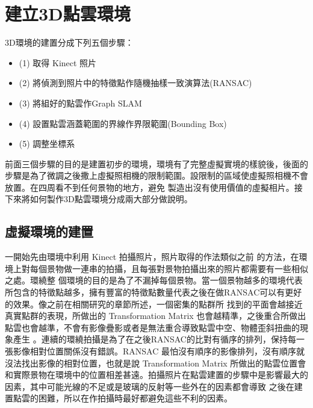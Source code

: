 % 
\section{建立3D點雲環境}
   3D環境的建置分成下列五個步驟：

\begin{itemize}
	\item (1) 取得 Kinect 照片
    \item (2) 將偵測到照片中的特徵點作隨機抽樣一致演算法(RANSAC)
    \item (3) 將組好的點雲作Graph SLAM
    \item (4) 設置點雲涵蓋範圍的界線作界限範圍(Bounding Box)
    \item (5) 調整坐標系
\end{itemize}   
   
   前面三個步驟的目的是建置初步的環境，環境有了完整虛擬實境的樣貌後，後面的步驟是為了微調之後撒上虛擬照相機的限制範圍。設限制的區域使虛擬照相機不會放置。在四周看不到任何景物的地方，避免
   製造出沒有使用價值的虛擬相片。接下來將如何製作3D點雲環境分成兩大部分做說明。
   
%
\subsection{虛擬環境的建置}
   一開始先由環境中利用 Kinect 拍攝照片，照片取得的作法類似之前 \cite{Du2011}的方法，在環境上對每個景物做一連串的拍攝，且每張對景物拍攝出來的照片都需要有一些相似之處。環繞整
   個環境的目的是為了不漏掉每個景物。當一個景物越多的環境代表所包含的特徵點越多，擁有豐富的特徵點數量代表之後在做RANSAC可以有更好的效果。像之前在相關研究的章節所述，一個密集的點群所
   找到的平面會越接近真實點群的表現，所做出的 Transformation Matrix 也會越精準，之後重合所做出點雲也會越準，不會有影像疊影或者是無法重合導致點雲中空、物體歪斜扭曲的現象產生
   。連續的環繞拍攝是為了在之後RANSAC的比對有循序的排列，保持每一張影像相對位置關係沒有錯誤。RANSAC 最怕沒有順序的影像排列，沒有順序就沒法找出影像的相對位置，也就是說
   Transformation Matrix 所做出的點雲位置會和實際景物在環境中的位置相差甚遠。拍攝照片在點雲建置的步驟中是影響最大的因素，其中可能光線的不足或是玻璃的反射等一些外在的因素都會導致
   之後在建置點雲的困難，所以在作拍攝時最好都避免這些不利的因素。
     
